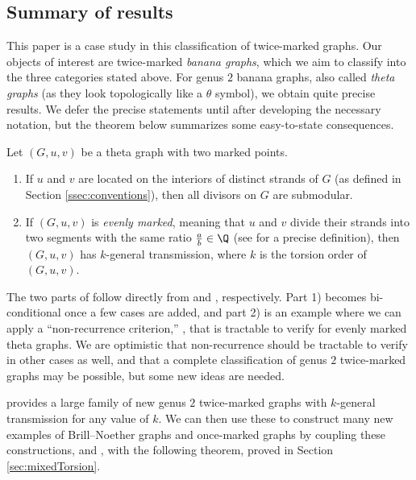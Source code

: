 \subsection{Summary of results}

This paper is a case study in this classification of twice-marked graphs. Our objects of interest are twice-marked \emph{banana graphs}, which we aim to classify into the three categories stated above.
For genus $2$ banana graphs, also called \emph{theta graphs} (as they look topologically like a $\theta$ symbol), we obtain quite precise results. We defer the precise statements until after developing the necessary notation, but the theorem below summarizes some easy-to-state consequences.

\begin{theorem}\label{thm:thetaSimple}
Let $(G,u,v)$ be a theta graph with two marked points.
\begin{enumerate}[label = \arabic*)]
    \item If $u$ and $v$ are located on the interiors of distinct strands of $G$ (as defined in Section \ref{ssec:conventions}), then all divisors on $G$ are submodular.
    \item If $(G,u,v)$ is \emph{evenly marked}, meaning that $u$ and $v$ divide their strands into two segments with the same ratio $\frac{a}{b} \in \Q$ (see  for a precise definition), then $(G,u,v)$ has $k$-general transmission, where 
    $k$ is the torsion order of $(G,u,v)$.
\end{enumerate}
\end{theorem}

The two parts of  follow directly from  and , respectively. Part 1) becomes bi-conditional once a few cases are added, and part 2) is an example where we can apply a ``non-recurrence criterion,'' , that is tractable to verify for evenly marked theta graphs. We are optimistic that non-recurrence should be tractable to verify in other cases as well, and that a complete classification of genus $2$ twice-marked graphs may be possible, but some new ideas are needed.

 provides a large family of new genus $2$ twice-marked graphs with $k$-general transmission for any value of $k$. We can then use these to construct many new examples of Brill--Noether graphs and once-marked graphs by coupling these constructions, and , with the following theorem, proved in Section \ref{sec:mixedTorsion}.

